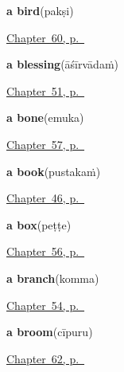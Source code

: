 \noindent\begin{minipage}[t]{\linewidth}
\raggedright
\textbf{a bird}\enspace\emph{}\enspace(pakṣi)\par
\footnotesize \hyperref[ch:te-animals]{Chapter~60, p.~\pageref*{ch:te-animals}}
\end{minipage}\par\smallskip

\noindent\begin{minipage}[t]{\linewidth}
\raggedright
\textbf{a blessing}\enspace\emph{}\enspace(āśīrvādaṁ)\par
\footnotesize \hyperref[ch:te-courtesy]{Chapter~51, p.~\pageref*{ch:te-courtesy}}
\end{minipage}\par\smallskip

\noindent\begin{minipage}[t]{\linewidth}
\raggedright
\textbf{a bone}\enspace\emph{}\enspace(emuka)\par
\footnotesize \hyperref[ch:te-more-body]{Chapter~57, p.~\pageref*{ch:te-more-body}}
\end{minipage}\par\smallskip

\noindent\begin{minipage}[t]{\linewidth}
\raggedright
\textbf{a book}\enspace\emph{}\enspace(pustakaṁ)\par
\footnotesize \hyperref[ch:te-ask-for]{Chapter~46, p.~\pageref*{ch:te-ask-for}}
\end{minipage}\par\smallskip

\noindent\begin{minipage}[t]{\linewidth}
\raggedright
\textbf{a box}\enspace\emph{}\enspace(peṭṭe)\par
\footnotesize \hyperref[ch:te-house]{Chapter~56, p.~\pageref*{ch:te-house}}
\end{minipage}\par\smallskip

\noindent\begin{minipage}[t]{\linewidth}
\raggedright
\textbf{a branch}\enspace\emph{}\enspace(komma)\par
\footnotesize \hyperref[ch:te-tree]{Chapter~54, p.~\pageref*{ch:te-tree}}
\end{minipage}\par\smallskip

\noindent\begin{minipage}[t]{\linewidth}
\raggedright
\textbf{a broom}\enspace\emph{}\enspace(cīpuru)\par
\footnotesize \hyperref[ch:te-made-things]{Chapter~62, p.~\pageref*{ch:te-made-things}}
\end{minipage}\par\smallskip

